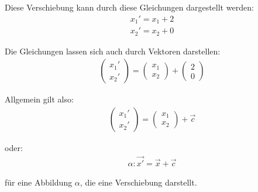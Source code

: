 \begin{flushleft}
Diese Verschiebung kann durch diese Gleichungen dargestellt werden:
\begin{align}
    x_1'=x_1+2 \\
    x_2'=x_2+0
\end{align}

Die Gleichungen lassen sich auch durch Vektoren darstellen:
\begin{align}
    \begin{pmatrix}
        x_1' \\
        x_2'
    \end{pmatrix}=\begin{pmatrix}
        x_1 \\
        x_2
    \end{pmatrix}+\begin{pmatrix}
        2 \\
        0
    \end{pmatrix}
\end{align}

Allgemein gilt also:
\begin{align}
    \begin{pmatrix}
        x_1' \\
        x_2'
    \end{pmatrix}=\begin{pmatrix}
        x_1 \\
        x_2
    \end{pmatrix}+\vec{c}
\end{align}

oder:
\begin{align}
    \alpha\colon \vec{x'}=\vec{x}+\vec{c}
\end{align}

für eine Abbildung $\alpha$, die eine Verschiebung darstellt.
\end{flushleft}

